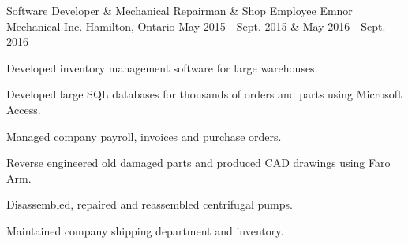 \begin{cventries}
  \cventry
    {Software Developer \& Mechanical Repairman \& Shop Employee} %
    {Emnor Mechanical Inc.} %
    {Hamilton, Ontario} %
    {May 2015 - Sept. 2015 \& May 2016 - Sept. 2016} %
    {
      \begin{cvitems} %
        \item {Developed inventory management software for large warehouses.}
        \item {Developed large SQL databases for thousands of orders and parts using Microsoft Access.}
        \item {Managed company payroll, invoices and purchase orders.}
        \item {Reverse engineered old damaged parts and produced CAD drawings using Faro Arm.}
        \item {Disassembled, repaired and reassembled centrifugal pumps.}
        \item {Maintained company shipping department and inventory.}
      \end{cvitems}
    }

\end{cventries}
